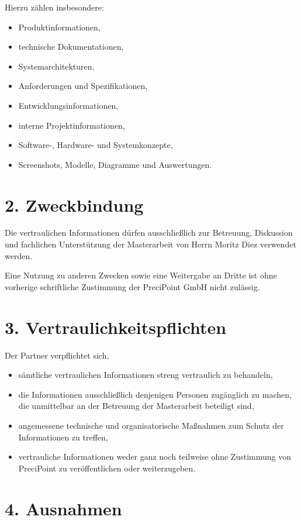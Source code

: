 \documentclass[11pt]{article}
\begin{document}
Hierzu zählen insbesondere:

\begin{itemize}
    \item Produktinformationen,
    \item technische Dokumentationen,
    \item Systemarchitekturen,
    \item Anforderungen und Spezifikationen,
    \item Entwicklungsinformationen,
    \item interne Projektinformationen,
    \item Software-, Hardware- und Systemkonzepte,
    \item Screenshots, Modelle, Diagramme und Auswertungen.
\end{itemize}

\section*{2. Zweckbindung}

Die vertraulichen Informationen dürfen ausschließlich zur Betreuung, Diskussion und fachlichen Unterstützung der Masterarbeit von Herrn Moritz Diez verwendet werden.

Eine Nutzung zu anderen Zwecken sowie eine Weitergabe an Dritte ist ohne vorherige schriftliche Zustimmung der PreciPoint GmbH nicht zulässig.

\section*{3. Vertraulichkeitspflichten}

Der Partner verpflichtet sich,

\begin{itemize}
    \item sämtliche vertraulichen Informationen streng vertraulich zu behandeln,
    \item die Informationen ausschließlich denjenigen Personen zugänglich zu machen, die unmittelbar an der Betreuung der Masterarbeit beteiligt sind,
    \item angemessene technische und organisatorische Maßnahmen zum Schutz der Informationen zu treffen,
    \item vertrauliche Informationen weder ganz noch teilweise ohne Zustimmung von PreciPoint zu veröffentlichen oder weiterzugeben.
\end{itemize}

\section*{4. Ausnahmen}
\end{document}
